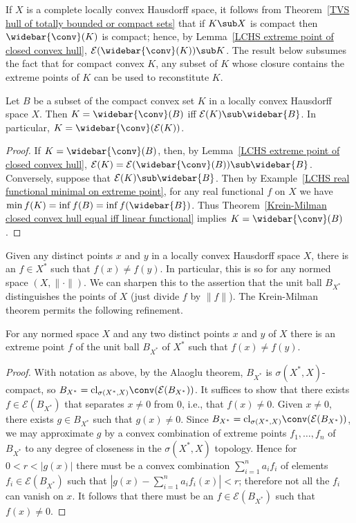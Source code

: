 If $X$ is a complete locally convex Hausdorff space, it follows from Theorem~\ref{TVS hull of totally bounded or compact sets} that if $K\sub X$ is compact then $\widebar{\conv}(K)$ is compact; hence, by Lemma~\ref{LCHS extreme point of closed convex hull}, $\mathcal{E}(\widebar{\conv}(K))\sub K$. The result below subsumes the fact that for compact convex $K$, any subset of $K$ whose closure contains the extreme points of $K$ can be used to reconstitute $K$.
\begin{theorem}\label{Krein-Milman closed convex hull equal iff extreme point}
Let $B$ be a subset of the compact convex set $K$ in a locally convex Hausdorff space $X$. Then $K=\widebar{\conv}(B)$ iff $\mathcal{E}(K)\sub\widebar{B}$. In particular, $K=\widebar{\conv}(\mathcal{E}(K))$.
\end{theorem}
\begin{proof}
If $K=\widebar{\conv}(B)$, then, by Lemma~\ref{LCHS extreme point of closed convex hull}, $\mathcal{E}(K)=\mathcal{E}(\widebar{\conv}(B))\sub\widebar{B}$. Conversely, suppose that $\mathcal{E}(K)\sub\widebar{B}$. Then by Example~\ref{LCHS real functional minimal on extreme point}, for any real functional $f$ on $X$ we have $\min f(K)=\inf f(B)=\inf f(\widebar{B})$. Thus Theorem~\ref{Krein-Milman closed convex hull equal iff linear functional} implies $K=\widebar{\conv}(B)$.
\end{proof}
Given any distinct points $x$ and $y$ in a locally convex Hausdorff space $X$, there is an $f\in X^*$ such that $f(x)\neq f(y)$. In particular, this is so for any normed space $(X,\|\cdot\|)$. We can sharpen this to the assertion that the unit ball $B_{X^*}$ distinguishes the points of $X$ (just divide $f$ by $\|f\|$). The Krein-Milman theorem permits the following refinement.
\begin{proposition}\label{NVS extreme point distinguish point}
For any normed space $X$ and any two distinct points $x$ and $y$ of $X$ there is an extreme point $f$ of the unit ball $B_{X^*}$ of $X^*$ such that $f(x)\neq f(y)$.
\end{proposition}
\begin{proof}
With notation as above, by the Alaoglu theorem, $B_{X^*}$ is $\sigma(X^*,X)$-compact, so $B_{X^*}=\mathrm{cl}_{\sigma(X^*,X)}\conv(\mathcal{E}(B_{X^*}))$. It suffices to show that there exists $f\in\mathcal{E}(B_{X^*})$ that separates $x\neq 0$ from $0$, i.e., that $f(x)\neq 0$. Given $x\neq 0$, there exists $g\in B_{X^*}$ such that $g(x)\neq 0$. Since $B_{X^*}=\mathrm{cl}_{\sigma(X^*,X)}\conv(\mathcal{E}(B_{X^*}))$, we may approximate $g$ by a convex combination of extreme points $f_1,\dots,f_n$ of $B_{X^*}$ to any degree of closeness in the $\sigma(X^*,X)$ topology. Hence for $0<r<|g(x)|$ there must be a convex combination $\sum_{i=1}^{n}a_if_i$ of elements $f_i\in\mathcal{E}(B_{X^*})$ such that $|g(x)-\sum_{i=1}^{n}a_if_i(x)|<r$; therefore not all the $f_i$ can vanish on $x$. It follows that there must be an $f\in\mathcal{E}(B_{X^*})$ such that $f(x)\neq 0$.
\end{proof}
